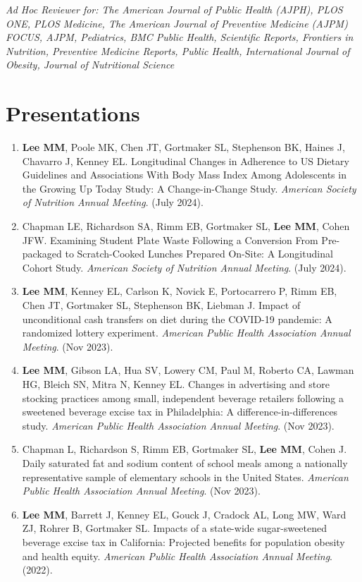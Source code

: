 \documentclass{cv_style}
\begin{document}
\textit{Ad Hoc Reviewer for: The American Journal of Public Health (AJPH), PLOS ONE, PLOS Medicine, The American Journal of Preventive Medicine (AJPM) FOCUS, AJPM, Pediatrics, BMC Public Health, Scientific Reports, Frontiers in Nutrition, Preventive Medicine Reports, Public Health, International Journal of Obesity, Journal of Nutritional Science}


\section{Presentations}
\begin{enumerate}[leftmargin = 2em]
    \item \textbf{Lee MM}, Poole MK, Chen JT, Gortmaker SL, Stephenson BK, Haines J, Chavarro J, Kenney EL.  Longitudinal Changes in Adherence to US Dietary Guidelines and Associations With Body Mass Index Among Adolescents in the Growing Up Today Study: A Change-in-Change Study.  \textit{American Society of Nutrition Annual Meeting}. (July 2024). 
    \item \parskip 1pt Chapman LE, Richardson SA, Rimm EB, Gortmaker SL, \textbf{Lee MM}, Cohen JFW. Examining Student Plate Waste Following a Conversion From Pre-packaged to Scratch-Cooked Lunches Prepared On-Site: A Longitudinal Cohort Study. \textit{American Society of Nutrition Annual Meeting}. (July 2024). 
    \item \parskip 1pt \textbf{Lee MM}, Kenney EL, Carlson K, Novick E, Portocarrero P, Rimm EB, Chen JT, Gortmaker SL, Stephenson BK, Liebman J. Impact of unconditional cash transfers on diet during the COVID-19 pandemic: A randomized lottery experiment. \textit{American Public Health Association Annual Meeting}. (Nov 2023). 
    \item \parskip 1pt \textbf{Lee MM}, Gibson LA, Hua SV, Lowery CM, Paul M, Roberto CA, Lawman HG, Bleich SN, Mitra N, Kenney EL. Changes in advertising and store stocking practices among small, independent beverage retailers following a sweetened beverage excise tax in Philadelphia: A difference-in-differences study. \textit{American Public Health Association Annual Meeting}. (Nov 2023).  
    \item \parskip 1pt Chapman L, Richardson S, Rimm EB, Gortmaker SL, \textbf{Lee MM}, Cohen J. Daily saturated fat and sodium content of school meals among a nationally representative sample of elementary schools in the United States. \textit{American Public Health Association Annual Meeting}. (Nov 2023). 
    \item \parskip 1pt \textbf{Lee MM}, Barrett J, Kenney EL, Gouck J, Cradock AL, Long MW, Ward ZJ, Rohrer B, Gortmaker SL. Impacts of a state-wide sugar-sweetened beverage excise tax in California: Projected benefits for population obesity and health equity. \textit{American Public Health Association Annual Meeting}. (2022).

\end{enumerate}
\end{document}
